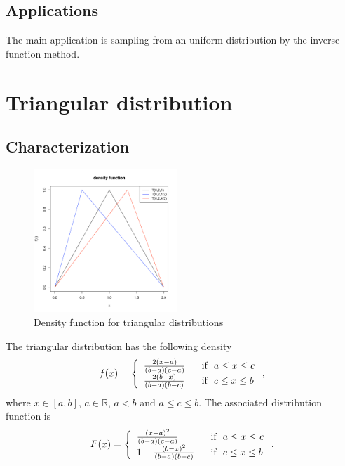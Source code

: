 \subsection{Applications}
The main application is sampling from an uniform distribution by the inverse function method.


\section{Triangular distribution}
\subsection{Characterization}
\begin{figure}
  \vspace{-20pt}
  \begin{center}
    \includegraphics[width=0.48\textwidth]{img/trianglezoom}
  \end{center}
  \vspace{-20pt}  
  \caption{Density function for triangular distributions}
\end{figure}

The triangular distribution has the following density
$$
f(x) = \left\{
\begin{array}{ll}
\frac{2(x-a)}{(b-a)(c-a)} & \textrm{~~if~~} a\leq x\leq c\\
\frac{2(b-x)}{(b-a)(b-c)} & \textrm{~~if~~}c\leq x\leq b
\end{array}
\right. ,
$$
where $x\in[a,b]$, $a\in\mathbb R$, $a < b$ and $a\leq c\leq b$. The associated distribution function
is
$$
F(x) = \left\{
\begin{array}{ll}
\frac{(x-a)^2}{(b-a)(c-a)} & \textrm{~~if~~} a\leq x\leq c\\
1-  \frac{(b-x)^2}{(b-a)(b-c)} & \textrm{~~if~~}c\leq x\leq b
\end{array}
\right. .
$$

